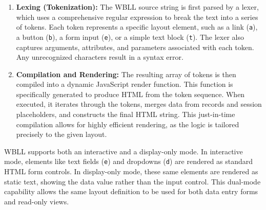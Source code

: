 \begin{enumerate}
    \item \textbf{Lexing (Tokenization):} The WBLL source string is first parsed by a lexer, which uses a comprehensive regular expression to break the text into a series of tokens. Each token represents a specific layout element, such as a link (\texttt{a}), a button (\texttt{b}), a form input (\texttt{e}), or a simple text block (\texttt{t}). The lexer also captures arguments, attributes, and parameters associated with each token. Any unrecognized characters result in a syntax error.
    
    \item \textbf{Compilation and Rendering:} The resulting array of tokens is then compiled into a dynamic JavaScript render function. This function is specifically generated to produce HTML from the token sequence. When executed, it iterates through the tokens, merges data from records and session placeholders, and constructs the final HTML string. This just-in-time compilation allows for highly efficient rendering, as the logic is tailored precisely to the given layout.
\end{enumerate}

WBLL supports both an interactive and a display-only mode. In interactive mode, elements like text fields (\texttt{e}) and dropdowns (\texttt{d}) are rendered as standard HTML form controls. In display-only mode, these same elements are rendered as static text, showing the data value rather than the input control. This dual-mode capability allows the same layout definition to be used for both data entry forms and read-only views.
